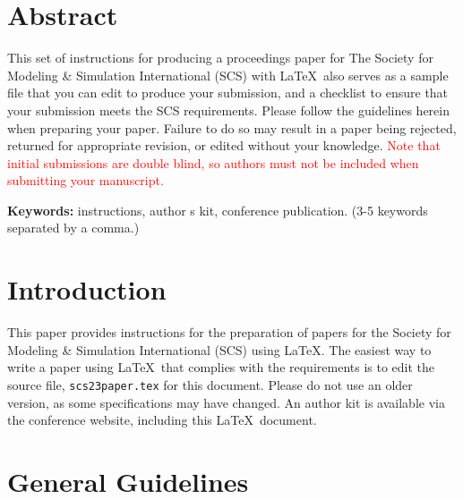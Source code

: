 \documentclass{article}
\begin{document}

\maketitle

\section*{Abstract}

This set of instructions for producing a proceedings paper for The Society for Modeling \& Simulation International (SCS) with \LaTeX\ also serves as a sample file that you can edit to produce your submission, and a checklist to ensure that your submission meets the SCS requirements. Please follow the guidelines herein when preparing your paper. Failure to do so may result in a paper being rejected, returned for appropriate revision, or edited without your knowledge. \textcolor{red}{Note that initial submissions are double blind, so authors must not be included when submitting your manuscript.}

\textbf{Keywords:} instructions, author s kit, conference publication. (3-5 keywords separated by a comma.)

\section{Introduction}
\label{sec:intro}

This paper provides instructions for the preparation of papers for the Society for Modeling \& Simulation International (SCS) using \LaTeX. 
The easiest way to write a paper using \LaTeX\ that complies with the requirements is to edit the source file, \texttt{scs23paper.tex} for this document. Please do not use an older version, as some specifications may have changed. An author kit is available via the conference website, including this \LaTeX\ document. 

\section{General Guidelines}
\end{document}
